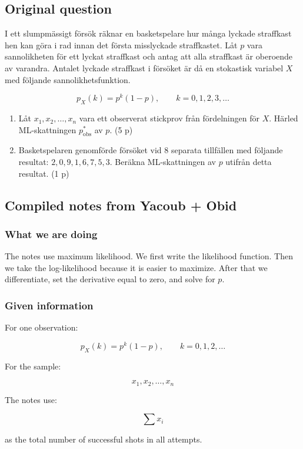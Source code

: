 \documentclass[10pt]{article}
\begin{document}
\subsection*{Original question}
I ett slumpmässigt försök räknar en basketspelare hur många lyckade
straffkast hen kan göra i rad innan det första misslyckade
straffkastet. Låt $p$ vara sannolikheten för ett lyckat straffkast
och antag att alla straffkast är oberoende av varandra. Antalet
lyckade straffkast i försöket är då en stokastisk variabel $X$ med
följande sannolikhetsfunktion.

\[
p_X(k)=p^k(1-p),
\qquad
k=0,1,2,3,\ldots
\]

\begin{enumerate}[label=\alph*)]
\item
Låt $x_1,x_2,\ldots,x_n$ vara ett observerat stickprov från
fördelningen för $X$. Härled ML-skattningen
$p^*_{\mathrm{obs}}$ av $p$.
\hfill (5 p)

\item
Basketspelaren genomförde försöket vid 8 separata tillfällen med
följande resultat: $2,0,9,1,6,7,5,3$. Beräkna ML-skattningen av
$p$ utifrån detta resultat.
\hfill (1 p)
\end{enumerate}

\subsection*{Compiled notes from Yacoub + Obid}

\subsubsection*{What we are doing}
The notes use maximum likelihood.
We first write the likelihood function.
Then we take the log-likelihood because it is easier to maximize.
After that we differentiate, set the derivative equal to zero,
and solve for $p$.

\subsubsection*{Given information}
For one observation:

\[
p_X(k)=p^k(1-p),
\qquad
k=0,1,2,\ldots
\]

For the sample:

\[
x_1,x_2,\ldots,x_n
\]

The notes use:

\[
\sum x_i
\]

as the total number of successful shots in all attempts.
\end{document}
